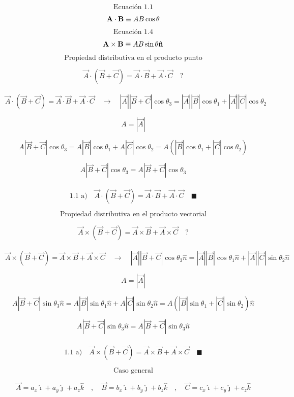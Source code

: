 \documentclass[10pt,a4papper]{article}
\begin{document}
\[\text{Ecuación 1.1}\]

\[\vb{A\cdot B}\equiv AB\cos\theta\]

\[\text{Ecuación 1.4}\]

\[\vb{A\times B}\equiv AB\sin\theta\vb{\hat n}\]

\newpage
\[\text{Propiedad distributiva en el producto punto}\]

\[\vec A\cdot(\vec B+\vec C)=\vec A\cdot\vec B+\vec A\cdot\vec C\quad?\]\\

\[\vec A\cdot(\vec B+\vec C)=\vec A\cdot\vec B+\vec A\cdot\vec C\quad\to\quad
|\vec A||\vec B+\vec C|\cos\theta_3=|\vec A||\vec B|\cos\theta_1+|\vec A||\vec C|\cos\theta_2\]

\[A=|\vec A|\]

\[A|\vec B+\vec C|\cos\theta_3=A|\vec B|\cos\theta_1+A|\vec C|\cos\theta_2=A\left(|\vec B|\cos\theta_1+|\vec C|\cos\theta_2\right)\]

\[A|\vec B+\vec C|\cos\theta_3=A|\vec B+\vec C|\cos\theta_3\]\\

\[\boxed{\text{1.1 a)}\quad\vec A\cdot(\vec B+\vec C)=\vec A\cdot\vec B+\vec A\cdot\vec C\quad\blacksquare}\]

\newpage
\[\text{Propiedad distributiva en el producto vectorial}\]

\[\vec A\times(\vec B+\vec C)=\vec A\times\vec B+\vec A\times\vec C\quad?\]\\

\[\vec A\times(\vec B+\vec C)=\vec A\times\vec B+\vec A\times\vec C\quad\to\quad
|\vec A||\vec B+\vec C|\cos\theta_3\hat n=|\vec A||\vec B|\cos\theta_1\hat n+|\vec A||\vec C|\sin\theta_2\hat n\]

\[A=|\vec A|\]

\[A|\vec B+\vec C|\sin\theta_3\hat n=A|\vec B|\sin\theta_1\hat n+A|\vec C|\sin\theta_2\hat n=A\left(|\vec B|\sin\theta_1+|\vec C|\sin\theta_2\right)\hat n\]

\[A|\vec B+\vec C|\sin\theta_3\hat n=A|\vec B+\vec C|\sin\theta_3\hat n\]\\

\[\boxed{\text{1.1 a)}\quad\vec A\times(\vec B+\vec C)=\vec A\times\vec B+\vec A\times\vec C\quad\blacksquare}\]

\newpage
\[\text{Caso general}\]

\[\vec A=a_x\hat\imath+a_y\hat\jmath+a_z\hat k\quad,\quad
\vec B=b_x\hat\imath+b_y\hat\jmath+b_z\hat k\quad,\quad
\vec C=c_x\hat\imath+c_y\hat\jmath+c_z\hat k\]
\end{document}
